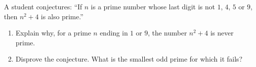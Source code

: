 A student conjectures: ``If $n$ is a prime number whose last digit is not $1$, $4$, $5$ or $9$, then $n^2+4$ is also prime.''
\begin{enumerate}
\item[(a)] Explain why, for a prime $n$ ending in $1$ or $9$, the number $n^2+4$ is never prime.
\item[(b)] Disprove the conjecture. What is the smallest odd prime for which it fails?
\end{enumerate}
